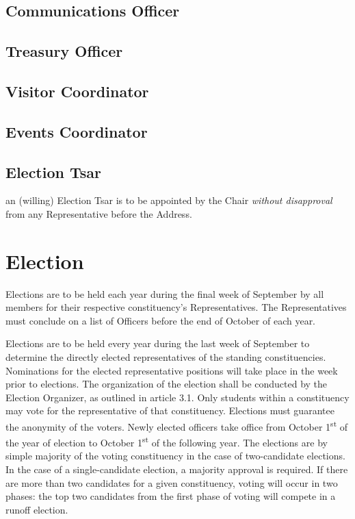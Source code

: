 \documentclass[8pt]{article}
\begin{document}
	\subsection{Communications Officer}
	\subsection{Treasury Officer}
	\subsection{Visitor Coordinator}
	\subsection{Events Coordinator}
	\subsection{Election Tsar}
	an (willing) Election Tsar is to be appointed by the Chair \textit{without disapproval} from any Representative before the Address.
	
	\section{Election}
	Elections are to be held each year during the final week of September by all members for their respective constituency's Representatives. The Representatives must conclude on a list of Officers before the end of October of each year.
	
	Elections are to be held every year during the last week of September to determine the directly elected representatives of the standing constituencies. Nominations for the elected representative positions will take place in the week prior to elections. The organization of the election shall be conducted by the Election Organizer, as outlined in article 3.1. Only students within a constituency may vote for the representative of that constituency. Elections must guarantee the anonymity of the voters. Newly elected officers take office from October 1\textsuperscript{st} of the year of election to October 1\textsuperscript{st} of the following year. The elections are by simple majority of the voting constituency in the case of two-candidate elections. In the case of a single-candidate election, a majority approval is required. If there are more than two candidates for a given constituency, voting will occur in two phases: the top two candidates from the first phase of voting will compete in a runoff election.
	
\end{document}
